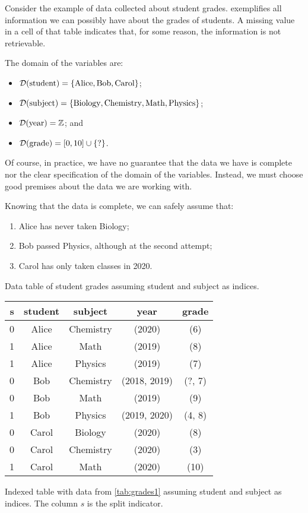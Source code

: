 Consider the example of data collected about student grades.  
exemplifies all information we can possibly have about the grades of students.  A missing
value in a cell of that table indicates that, for some reason, the information is not
retrievable.

The domain of the variables are:
\begin{itemize}
  \itemsep0em
  \item $\mathcal{D}\!\left(\text{student}\right) = \left\{\text{Alice}, \text{Bob}, \text{Carol}\right\}$;
  \item $\mathcal{D}\!\left(\text{subject}\right) = \left\{\text{Biology}, \text{Chemistry}, \text{Math},
    \text{Physics}\right\}$;
  \item $\mathcal{D}\!\left(\text{year}\right) = \mathbb{Z}$; and
  \item $\mathcal{D}\!\left(\text{grade}\right) = \left[0, 10\right] \cup \left\{\text{?}\right\}$.
\end{itemize}

Of course, in practice, we have no guarantee that the data we have is complete nor the
clear specification of the domain of the variables.  Instead, we must choose good
premises about the data we are working with.

Knowing that the data is complete, we can safely assume that:
\begin{enumerate}
  \itemsep0em
  \item Alice has never taken Biology;
  \item Bob passed Physics, although at the second attempt;
  \item Carol has only taken classes in 2020.
\end{enumerate}

\begin{tablebox}[label=tab:grades2]{Data table of student grades assuming student and subject as indices.}
  \centering
  \begin{tabular}{ccccc}
    \toprule
    \textbf{s} & \textbf{student} & \textbf{subject} & \textbf{year} & \textbf{grade} \\
    \midrule
    0 & Alice & Chemistry & (2020) & (6) \\
    1 & Alice & Math & (2019) & (8) \\
    1 & Alice & Physics & (2019) & (7) \\
    0 & Bob & Chemistry & (2018, 2019) & (?, 7) \\
    0 & Bob & Math & (2019) & (9) \\
    1 & Bob & Physics & (2019, 2020) & (4, 8) \\
    0 & Carol & Biology & (2020) & (8) \\
    0 & Carol & Chemistry & (2020) & (3) \\
    1 & Carol & Math & (2020) & (10) \\
    \bottomrule
  \end{tabular}
  \tcblower
  Indexed table with data from \cref{tab:grades1} assuming student and
  subject as indices.  The column $s$ is the split indicator.
\end{tablebox}


